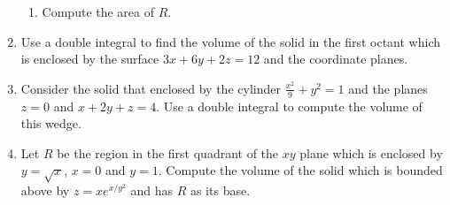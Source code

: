 \documentclass[12pt]{article}
\newif\ifans
\begin{document}
\begin{enumerate}
\begin{enumerate}
\item Compute the area of $R$.

\ifans{\fbox{$\frac{32}{3}$}} \fi

\end{enumerate}

\item Use a double integral to find the volume of the solid in the first octant which is enclosed by the surface $3x+6y+2z=12$ and the coordinate planes.

\ifans{\fbox{8}} \fi

\item Consider the solid that enclosed by the cylinder $\frac{x^2}{9}+y^2=1$ and the planes $z=0$ and $x+2y+z=4$.  Use a double integral to compute the volume of this wedge.

\ifans{\fbox{$12\pi$; Detailed Solution: \textcolor{blue}{\href{http://www.math.drexel.edu/classes/Calculus/resources/Math200HW/Solutions/17_200_Double_Int_II_12.pdf}{Here}}}} \fi

\item Let $R$ be the region in the first quadrant of the $xy$ plane which is enclosed by $y=\sqrt{x}$, $x=0$ and $y=1$.  Compute the volume of the solid which is bounded above by $z=xe^{x/y^2}$ and has $R$ as its base.

\ifans{\fbox{$\frac{1}{5}$; Detailed Solution: \textcolor{blue}{\href{http://www.math.drexel.edu/classes/Calculus/resources/Math200HW/Solutions/17_200_Double_Int_II_13.pdf}{Here}}}} \fi

\end{enumerate}
\end{document}
